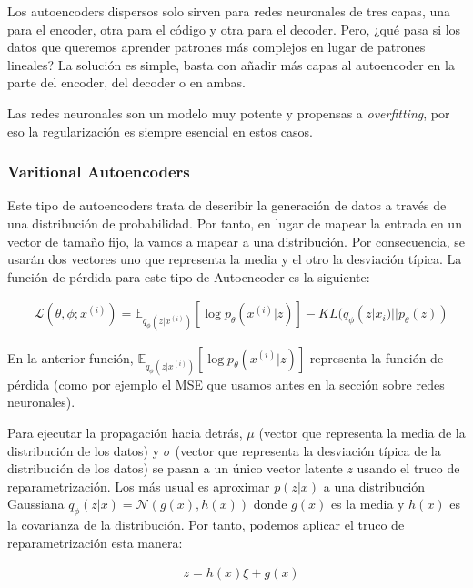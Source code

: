 Los autoencoders dispersos solo sirven para redes neuronales de tres capas, una para el encoder, otra para el código y otra para el decoder. Pero, ¿qué pasa si los datos que queremos aprender patrones más complejos en lugar de patrones lineales? La solución es simple, basta con añadir más capas al autoencoder en la parte del encoder, del decoder o en ambas.\newline

Las redes neuronales son un modelo muy potente y propensas a \textit{overfitting}, por eso la regularización es siempre esencial en estos casos.

\subsubsection{Varitional Autoencoders}

Este tipo de autoencoders trata de describir la generación de datos a través de una distribución de probabilidad. Por tanto, en lugar de mapear la entrada en un vector de tamaño fijo, la vamos a mapear a una distribución. Por consecuencia, se usarán dos vectores uno que representa la media y el otro la desviación típica. La función de pérdida para este tipo de Autoencoder es la siguiente:

\begin{align}
	&\mathcal{L}(\theta, \phi; x^{(i)}) = \mathbb{E}_{q_\phi(z|x^{(i)})} \left[ \log p_\theta(x^{(i)}|z) \right] - KL(q_\phi(z|x_i)||p_\theta(z))
\end{align}

En la anterior función, $\mathbb{E}_{q_\phi(z|x^{(i)})} \left[ \log p_\theta(x^{(i)}|z) \right]$ representa la función de pérdida (como por ejemplo el MSE que usamos antes en la sección sobre redes neuronales).\newline

Para ejecutar la propagación hacia detrás, $\mu$ (vector que representa la media de la distribución de los datos) y $\sigma$ (vector que representa la desviación típica de la distribución de los datos) se pasan a un único vector latente $z$ usando el truco de reparametrización. Los más usual es aproximar $p(z|x)$ a una distribución Gaussiana $q_\phi(z|x) = \mathcal{N}(g(x),h(x))$ donde $g(x)$ es la media y $h(x)$ es la covarianza de la distribución. Por tanto, podemos aplicar el truco de reparametrización esta manera:

\begin{align}
	&z = h(x) \xi + g(x)
\end{align}

